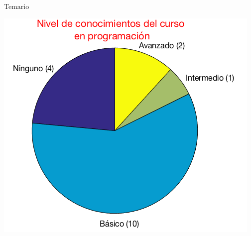 \documentclass{bredelebeamer}
\begin{document}
\begin{frame}{Temario}
\begin{center}
\includegraphics[scale=0.35]{images/estadisticas.png}
\end{center}
\end{frame}
\end{document}
